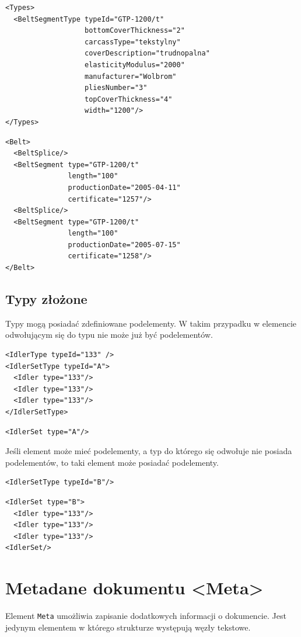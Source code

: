 \documentclass[12pt,a4paper]{article}
\begin{document}
\begin{verbatim}
<Types>
  <BeltSegmentType typeId="GTP-1200/t"
                   bottomCoverThickness="2"
                   carcassType="tekstylny"
                   coverDescription="trudnopalna"
                   elasticityModulus="2000"
                   manufacturer="Wolbrom"
                   pliesNumber="3"
                   topCoverThickness="4"
                   width="1200"/>
</Types>
\end{verbatim}

\begin{verbatim}
<Belt>
  <BeltSplice/>
  <BeltSegment type="GTP-1200/t"
               length="100"
               productionDate="2005-04-11"
               certificate="1257"/>
  <BeltSplice/>
  <BeltSegment type="GTP-1200/t"
               length="100"
               productionDate="2005-07-15"
               certificate="1258"/>
</Belt>
\end{verbatim}


\subsection{Typy złożone}
Typy mogą posiadać zdefiniowane podelementy.  W takim przypadku w elemencie
odwołującym się do typu nie może już być podelementów.

\begin{verbatim}
<IdlerType typeId="133" />
<IdlerSetType typeId="A">
  <Idler type="133"/>
  <Idler type="133"/>
  <Idler type="133"/>
</IdlerSetType>
\end{verbatim}

\begin{verbatim}
<IdlerSet type="A"/>
\end{verbatim}

Jeśli element może mieć podelementy, a typ do którego się odwołuje nie posiada
podelementów, to taki element może posiadać podelementy.

\begin{verbatim}
<IdlerSetType typeId="B"/>
\end{verbatim}

\begin{verbatim}
<IdlerSet type="B">
  <Idler type="133"/>
  <Idler type="133"/>
  <Idler type="133"/>
<IdlerSet/>
\end{verbatim}

\section{Metadane dokumentu <Meta>}
Element {\tt Meta} umożliwia zapisanie dodatkowych informacji o dokumencie.
Jest jedynym elementem w którego strukturze występują węzły tekstowe.
\end{document}
